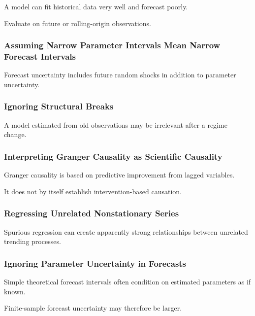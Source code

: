 A model can fit historical data very well and forecast poorly.

Evaluate on future or rolling-origin observations.

\subsubsection{Assuming Narrow Parameter Intervals Mean Narrow Forecast Intervals}

Forecast uncertainty includes future random shocks in addition to
parameter uncertainty.

\subsubsection{Ignoring Structural Breaks}

A model estimated from old observations may be irrelevant after a regime
change.

\subsubsection{Interpreting Granger Causality as Scientific Causality}

Granger causality is based on predictive improvement from lagged
variables.

It does not by itself establish intervention-based causation.

\subsubsection{Regressing Unrelated Nonstationary Series}

Spurious regression can create apparently strong relationships between
unrelated trending processes.

\subsubsection{Ignoring Parameter Uncertainty in Forecasts}

Simple theoretical forecast intervals often condition on estimated
parameters as if known.

Finite-sample forecast uncertainty may therefore be larger.

